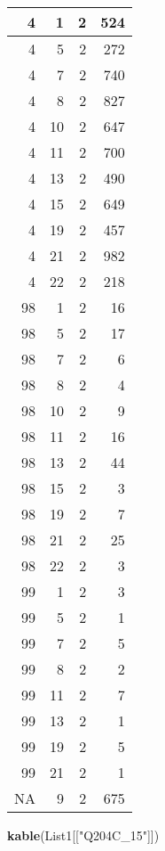 \documentclass[]{article}
\newenvironment{Shaded}{\begin{snugshade}}{\end{snugshade}}
\newcommand{\KeywordTok}[1]{\textcolor[rgb]{0.13,0.29,0.53}{\textbf{#1}}}
\newcommand{\NormalTok}[1]{#1}
\newcommand{\StringTok}[1]{\textcolor[rgb]{0.31,0.60,0.02}{#1}}
\begin{document}
\begin{tabular}{r|r|r|r}
\hline
4 & 1 & 2 & 524\\
\hline
4 & 5 & 2 & 272\\
\hline
4 & 7 & 2 & 740\\
\hline
4 & 8 & 2 & 827\\
\hline
4 & 10 & 2 & 647\\
\hline
4 & 11 & 2 & 700\\
\hline
4 & 13 & 2 & 490\\
\hline
4 & 15 & 2 & 649\\
\hline
4 & 19 & 2 & 457\\
\hline
4 & 21 & 2 & 982\\
\hline
4 & 22 & 2 & 218\\
\hline
98 & 1 & 2 & 16\\
\hline
98 & 5 & 2 & 17\\
\hline
98 & 7 & 2 & 6\\
\hline
98 & 8 & 2 & 4\\
\hline
98 & 10 & 2 & 9\\
\hline
98 & 11 & 2 & 16\\
\hline
98 & 13 & 2 & 44\\
\hline
98 & 15 & 2 & 3\\
\hline
98 & 19 & 2 & 7\\
\hline
98 & 21 & 2 & 25\\
\hline
98 & 22 & 2 & 3\\
\hline
99 & 1 & 2 & 3\\
\hline
99 & 5 & 2 & 1\\
\hline
99 & 7 & 2 & 5\\
\hline
99 & 8 & 2 & 2\\
\hline
99 & 11 & 2 & 7\\
\hline
99 & 13 & 2 & 1\\
\hline
99 & 19 & 2 & 5\\
\hline
99 & 21 & 2 & 1\\
\hline
NA & 9 & 2 & 675\\
\hline
\end{tabular}

\begin{Shaded}
\begin{Highlighting}[]
\KeywordTok{kable}\NormalTok{(List1[[}\StringTok{"Q204C_15"}\NormalTok{]])}
\end{Highlighting}
\end{Shaded}
\end{document}
